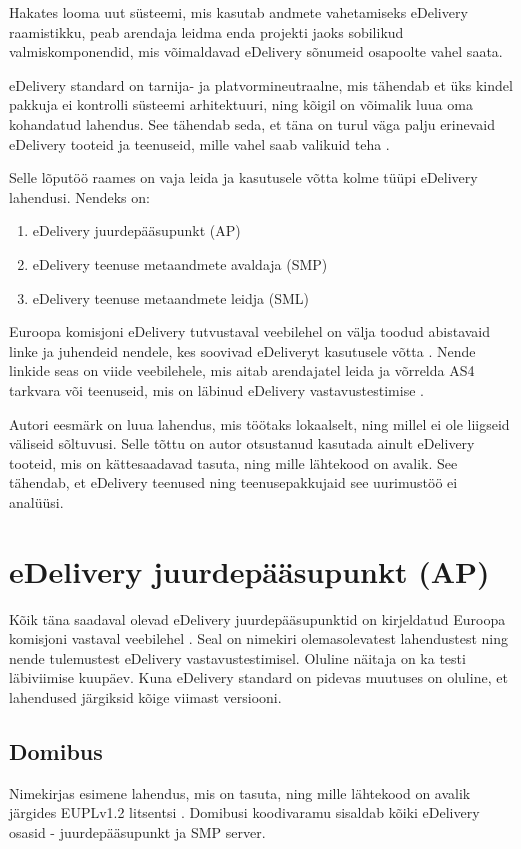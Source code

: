 Hakates looma uut süsteemi, mis kasutab andmete vahetamiseks eDelivery raamistikku,
peab arendaja leidma enda projekti jaoks sobilikud valmiskomponendid,
mis võimaldavad eDelivery sõnumeid osapoolte vahel saata.

eDelivery standard on tarnija- ja platvormineutraalne, mis tähendab et üks kindel pakkuja
ei kontrolli süsteemi arhitektuuri, ning kõigil on võimalik luua oma kohandatud lahendus.
See tähendab seda, et täna on turul väga palju erinevaid eDelivery tooteid ja teenuseid, 
mille vahel saab valikuid teha \cite{ec_edelivery_building_block}. 

Selle lõputöö raames on vaja leida ja kasutusele võtta kolme tüüpi eDelivery lahendusi. Nendeks on:
\begin{enumerate}
  \item eDelivery juurdepääsupunkt (AP)
  \item eDelivery teenuse metaandmete avaldaja (SMP)
  \item eDelivery teenuse metaandmete leidja (SML)
\end{enumerate}

Euroopa komisjoni eDelivery tutvustaval veebilehel on välja toodud abistavaid linke ja juhendeid nendele,
kes soovivad eDeliveryt kasutusele võtta \cite{ec_edelivery_building_block}. 
Nende linkide seas on viide veebilehele,
mis aitab arendajatel leida ja võrrelda AS4 tarkvara või teenuseid, 
mis on läbinud eDelivery vastavustestimise \cite{ec_edelivery_as4_conformant_solutions}.

Autori eesmärk on luua lahendus, mis töötaks lokaalselt,
ning millel ei ole liigseid väliseid sõltuvusi. 
Selle tõttu on autor otsustanud kasutada ainult eDelivery tooteid, mis on kättesaadavad tasuta, 
ning mille lähtekood on avalik.
See tähendab, et eDelivery teenused ning teenusepakkujaid see uurimustöö ei analüüsi.

\section{eDelivery juurdepääsupunkt (AP)}
Kõik täna saadaval olevad eDelivery juurdepääsupunktid on kirjeldatud
Euroopa komisjoni vastaval veebilehel \cite{ec_edelivery_as4_v1x_conformant_products}. 
Seal on nimekiri olemasolevatest lahendustest ning nende tulemustest eDelivery vastavustestimisel.
Oluline näitaja on ka testi läbiviimise kuupäev. Kuna eDelivery standard on pidevas muutuses on
oluline, et lahendused järgiksid kõige viimast versiooni. 

\subsection{Domibus}
Nimekirjas esimene lahendus, mis on tasuta, 
ning mille lähtekood on avalik järgides EUPLv1.2 litsentsi \cite{ec_edelivery_domibus_repo}. 
Domibusi koodivaramu sisaldab kõiki eDelivery osasid - juurdepääsupunkt ja SMP server.  


